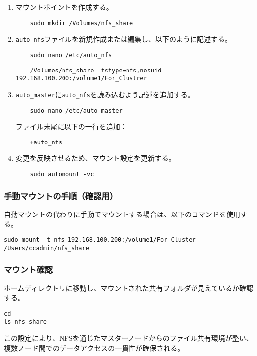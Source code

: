 \begin{enumerate}
    \item マウントポイントを作成する。
    \begin{verbatim}
    sudo mkdir /Volumes/nfs_share
    \end{verbatim}
    \item \texttt{auto\_nfs}ファイルを新規作成または編集し、以下のように記述する。
    \begin{verbatim}
    sudo nano /etc/auto_nfs
    \end{verbatim}
    \begin{verbatim}
    /Volumes/nfs_share -fstype=nfs,nosuid 192.168.100.200:/volume1/For_Clustrer
    \end{verbatim}
    \item \texttt{auto\_master}に\texttt{auto\_nfs}を読み込むよう記述を追加する。
    \begin{verbatim}
    sudo nano /etc/auto_master
    \end{verbatim}
    ファイル末尾に以下の一行を追加：
    \begin{verbatim}
    +auto_nfs
    \end{verbatim}
    \item 変更を反映させるため、マウント設定を更新する。
    \begin{verbatim}
    sudo automount -vc
    \end{verbatim}
\end{enumerate}

\subsubsection*{手動マウントの手順（確認用）}

自動マウントの代わりに手動でマウントする場合は、以下のコマンドを使用する。

\begin{verbatim}
sudo mount -t nfs 192.168.100.200:/volume1/For_Cluster /Users/ccadmin/nfs_share
\end{verbatim}

\subsubsection*{マウント確認}

ホームディレクトリに移動し、マウントされた共有フォルダが見えているか確認する。

\begin{verbatim}
cd
ls nfs_share
\end{verbatim}

この設定により、NFSを通じたマスターノードからのファイル共有環境が整い、複数ノード間でのデータアクセスの一貫性が確保される。
